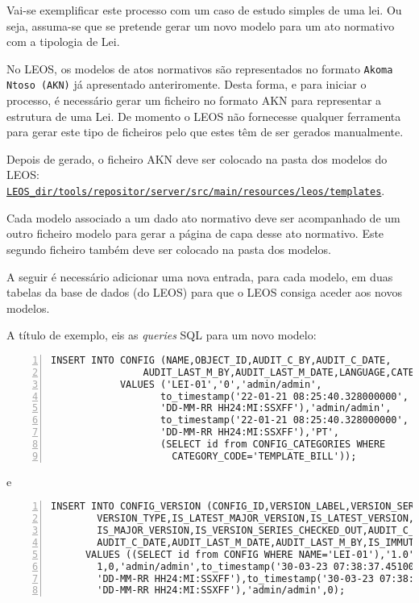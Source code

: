 Vai-se exemplificar este processo com um caso de estudo simples de uma lei.
Ou seja, assuma-se que se pretende gerar um novo modelo para um ato normativo com a tipologia de Lei.
 
No LEOS, os modelos de atos normativos são representados no formato \texttt{Akoma Ntoso (AKN)} já apresentado anteriromente. 
Desta forma, e para iniciar o processo, é necessário gerar um ficheiro no formato AKN para representar a estrutura de uma Lei. 
De momento o LEOS não fornecesse qualquer ferramenta para gerar este tipo de ficheiros pelo que estes têm de ser gerados 
manualmente.

Depois de gerado, o ficheiro AKN deve ser colocado na pasta dos modelos do LEOS: 
\texttt{\url{LEOS_dir/tools/repositor/server/src/main/resources/leos/templates}}.

Cada modelo associado a um dado ato normativo deve ser acompanhado de um outro ficheiro modelo para gerar a página de capa 
desse ato normativo. Este segundo ficheiro também deve ser colocado na pasta dos modelos.
 
A seguir é necessário adicionar uma nova entrada, para cada modelo, em duas tabelas da base de dados (do LEOS) 
para que o LEOS consiga aceder aos novos modelos.

A título de exemplo, eis as \emph{queries} SQL para um novo modelo:

\begin{Verbatim}[frame=single, numbers=left, fontsize=\scriptsize, commandchars=\\\{\}]
    INSERT INTO CONFIG (NAME,OBJECT_ID,AUDIT_C_BY,AUDIT_C_DATE,
                AUDIT_LAST_M_BY,AUDIT_LAST_M_DATE,LANGUAGE,CATEGORY_ID) 
            VALUES ('LEI-01','0','admin/admin',
                   to_timestamp('22-01-21 08:25:40.328000000',
                   'DD-MM-RR HH24:MI:SSXFF'),'admin/admin',
                   to_timestamp('22-01-21 08:25:40.328000000',
                   'DD-MM-RR HH24:MI:SSXFF'),'PT',
                   (SELECT id from CONFIG_CATEGORIES WHERE 
                     CATEGORY_CODE='TEMPLATE_BILL'));
\end{Verbatim}

e

\begin{Verbatim}[frame=single, numbers=left, fontsize=\scriptsize, commandchars=\\\{\}]
    INSERT INTO CONFIG_VERSION (CONFIG_ID,VERSION_LABEL,VERSION_SERIES_ID,
        VERSION_TYPE,IS_LATEST_MAJOR_VERSION,IS_LATEST_VERSION,
        IS_MAJOR_VERSION,IS_VERSION_SERIES_CHECKED_OUT,AUDIT_C_BY,
        AUDIT_C_DATE,AUDIT_LAST_M_DATE,AUDIT_LAST_M_BY,IS_IMMUTABLE) 
      VALUES ((SELECT id from CONFIG WHERE NAME='LEI-01'),'1.0','1',null,1,1,
        1,0,'admin/admin',to_timestamp('30-03-23 07:38:37.451000000',
        'DD-MM-RR HH24:MI:SSXFF'),to_timestamp('30-03-23 07:38:37.496000000',
        'DD-MM-RR HH24:MI:SSXFF'),'admin/admin',0);
\end{Verbatim}

